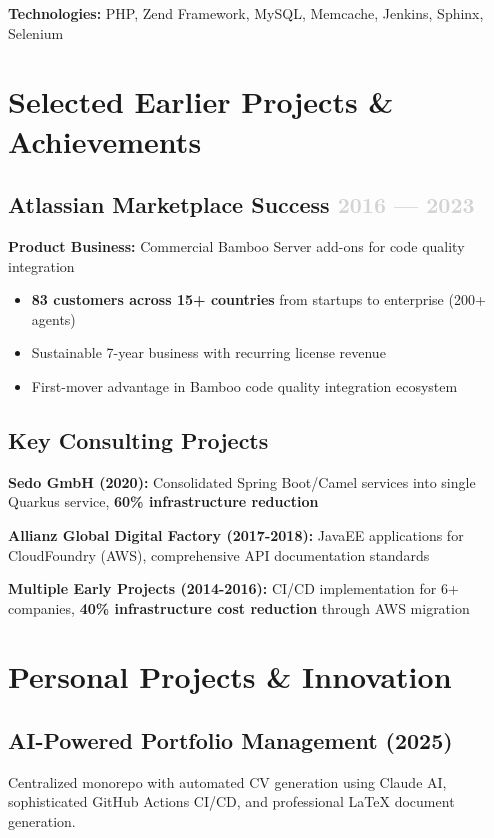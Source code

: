 \documentclass[11pt,a4paper]{article}
\begin{document}
\textbf{Technologies:} PHP, Zend Framework, MySQL, Memcache, Jenkins, Sphinx, Selenium

\section{Selected Earlier Projects \& Achievements}

\subsection{Atlassian Marketplace Success \hfill \textcolor{lightgray}{2016 — 2023}}
\textbf{Product Business:} Commercial Bamboo Server add-ons for code quality integration
\begin{itemize}
    \item \textbf{83 customers across 15+ countries} from startups to enterprise (200+ agents)
    \item Sustainable 7-year business with recurring license revenue
    \item First-mover advantage in Bamboo code quality integration ecosystem
\end{itemize}

\subsection{Key Consulting Projects}
\textbf{Sedo GmbH (2020):} Consolidated Spring Boot/Camel services into single Quarkus service, \textbf{60\% infrastructure reduction}

\textbf{Allianz Global Digital Factory (2017-2018):} JavaEE applications for CloudFoundry (AWS), comprehensive API documentation standards

\textbf{Multiple Early Projects (2014-2016):} CI/CD implementation for 6+ companies, \textbf{40\% infrastructure cost reduction} through AWS migration

\section{Personal Projects \& Innovation}

\subsection{AI-Powered Portfolio Management (2025)}
Centralized monorepo with automated CV generation using Claude AI, sophisticated GitHub Actions CI/CD, and professional LaTeX document generation.
\end{document}
